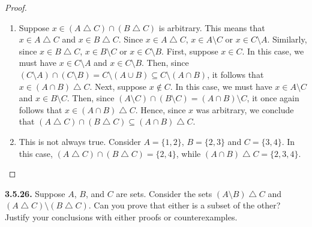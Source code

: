 \documentclass[12pt]{amsart}
\newenvironment{statement}[1]{\smallskip\noindent\color[rgb]{.6627, .3529, .6314} {\bf #1.}}{}
\theoremstyle{definition}
\theoremstyle{remark}
\begin{document}
\begin{proof}
\hfill
\begin{enumerate}
	\item Suppose $x \in (A \bigtriangleup C) \cap (B \bigtriangleup C)$ is arbitrary.
	This means that $x \in A \bigtriangleup C$ and $x \in B \bigtriangleup C$.
	Since $x \in A \bigtriangleup C$, $x \in A \setminus C$ or $x \in C \setminus A$.
	Similarly, since $x \in B \bigtriangleup C$, $x \in B \setminus C$ or $x \in C \setminus B$.
	First, suppose $x \in C$.
	In this case, we must have $x \in C \setminus A$ and $x \in C \setminus B$.
	Then, since $(C \setminus A) \cap (C \setminus B) = C \setminus (A \cup B) \subseteq
	C \setminus (A \cap B)$, it follows that $x \in (A \cap B) \bigtriangleup C$.
	Next, suppose $x \notin C$.
	In this case, we must have $x \in A \setminus C$ and $x \in B \setminus C$.
	Then, since $(A \setminus C) \cap (B \setminus C) = (A \cap B) \setminus C$, it once again
	follows that $x \in (A \cap B) \bigtriangleup C$.
	Hence, since $x$ was arbitrary, we conclude that 
	$(A \bigtriangleup C) \cap (B \bigtriangleup C) \subseteq (A \cap B) \bigtriangleup C$.
	
	\item This is not always true.
	Consider $A = \{ 1, 2 \}$, $B = \{ 2, 3 \}$ and $C = \{ 3, 4 \}$.
	In this case, $(A \bigtriangleup C) \cap (B \bigtriangleup C) = \{ 2, 4 \}$,
	while $(A \cap B) \bigtriangleup C = \{ 2, 3, 4 \}$.
\end{enumerate}
\end{proof}


\begin{statement}{3.5.26}
Suppose $A$, $B$, and $C$ are sets.
Consider the sets $(A \setminus B) \bigtriangleup C$ and $(A \bigtriangleup C) \setminus (B \bigtriangleup C)$.
Can you prove that either is a subset of the other?
Justify your conclusions with either proofs or counterexamples.
\end{statement}
\end{document}

